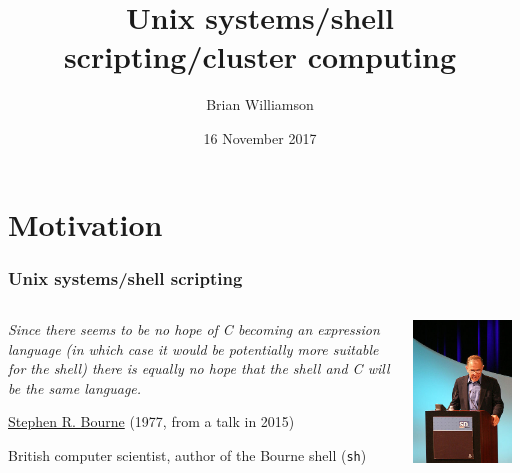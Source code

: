 \documentclass[12pt, 
hyperref={colorlinks=true, linkcolor=blue, urlcolor=cyan}]{beamer}
\title{Unix systems/shell scripting/cluster computing}
\author{Brian Williamson}
\institute{BIOST 561: Computational Skills For Biostatistics I}
\date{16 November 2017}
\newcommand{\myframe}[1]{\begin{frame} \frametitle{#1}}
\begin{document}
\begin{frame}
\titlepage
\end{frame}

\section{Motivation}
\myframe{Unix systems/shell scripting}
\begin{columns}[c]
\begin{column}{.66\textwidth}
\vspace{1cm}

\emph{Since there seems to be no hope of C becoming
an expression language (in which case it would be
potentially more suitable for the shell) there is
equally no hope that the shell and C will be the
same language.}

\vspace{2cm}
\href{https://en.wikipedia.org/wiki/Stephen_R._Bourne}{Stephen R. Bourne} (1977, from a talk in 2015)

British computer scientist, author of the Bourne shell (\texttt{sh})  
\end{column}
\begin{column}{.33\textwidth}
\includegraphics[width=1\textwidth]{bourne.jpg}
\end{column}
\end{columns}
\end{frame}
\end{document}
